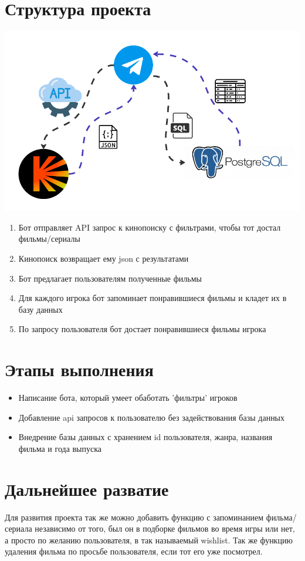 \documentclass{article}
\begin{document}
\section{Структура проекта}

\includegraphics[width=1\textwidth]{project_structure.png}

\begin{enumerate}
    \item Бот отправляет API запрос к кинопоиску с фильтрами, чтобы тот достал фильмы/сериалы
    \item Кинопоиск возвращает ему json с результатами
    \item Бот предлагает пользователям полученные фильмы
    \item Для каждого игрока бот запоминает понравившиеся фильмы и кладет их в базу данных
    \item По запросу пользователя бот достает понравившиеся фильмы игрока
\end{enumerate}

\section{Этапы выполнения}
\begin{itemize}
    \item Написание бота, который умеет обаботать 'фильтры' игроков
    \item Добавление api запросов к пользователю без задействования базы данных
    \item Внедрение базы данных с хранением id пользователя, жанра, названия фильма и года выпуска
\end{itemize}

\section{Дальнейшее разватие}
Для развития проекта так же можно добавить функцию с запоминанием фильма/сериала независимо от того, был он в подборке фильмов во время игры или нет, а просто по желанию пользователя, в так называемый wishlist. Так же функцию удаления фильма по просьбе пользователя, если тот его уже посмотрел.
\end{document}

